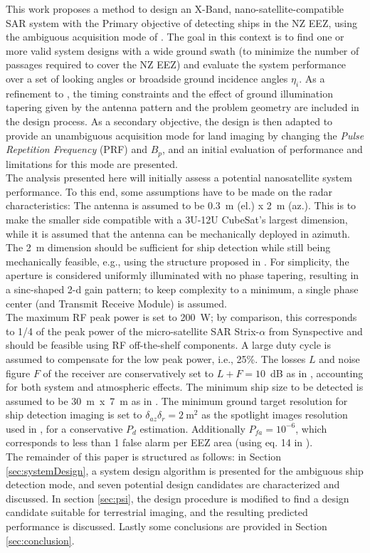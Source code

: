 \documentclass[conference,a4paper]{IEEEtran}
\begin{document}
    This work proposes a method to design an X-Band, nano-satellite-compatible SAR system with the Primary objective of detecting ships in the NZ EEZ, using the ambiguous acquisition mode of \cite{DLRjournal}.
    The goal in this context is to find one or more valid system designs with a wide ground swath (to minimize the number of passages required to cover the NZ EEZ) and evaluate the system performance over a set of looking angles or broadside ground incidence angles $\eta_i$.
    As a refinement to \cite{DLRjournal}, the timing constraints and the effect of ground illumination tapering given by the antenna pattern and the problem geometry are included in the design process.
    As a secondary objective, the design is then adapted to provide an unambiguous acquisition mode for land imaging by changing the \emph{Pulse Repetition Frequency} (PRF) and $B_p$, and an initial evaluation of performance and limitations for this mode are presented.\\
    The analysis presented here will initially assess a potential nanosatellite system performance.
    To this end, some assumptions have to be made on the radar characteristics: The antenna is assumed to be 0.3~m (el.) x 2~m (az.).
    This is to make the smaller side compatible with a 3U-12U CubeSat's largest dimension, while it is assumed that the antenna can be mechanically deployed in azimuth.
    The 2~m dimension should be sufficient for ship detection \cite{DLRjournal} while still being mechanically feasible, e.g., using the structure proposed in \cite{Annalisa}.
    For simplicity, the aperture is considered uniformly illuminated with no phase tapering, resulting in a sinc-shaped 2-d gain pattern;
    to keep complexity to a minimum, a single phase center (and Transmit Receive Module) is assumed.\\
    The maximum RF peak power is set to 200~W; by comparison, this corresponds to 1/4 of the peak power of the micro-satellite SAR Strix-$\alpha$ from Synspective \cite{StriX-a} and should be feasible using RF off-the-shelf components.
    A large duty cycle is assumed to compensate for the low peak power, i.e., 25\%.
    The losses $L$ and noise figure $F$ of the receiver are conservatively set to $L+F = 10$~dB as in \cite{JAN},
    accounting for both system and atmospheric effects.
    The minimum ship size to be detected is assumed to be 30~m~x~7~m as in \cite{JAN}.
    The minimum ground target resolution for ship detection imaging is set to $\delta_{az}\delta_{r}=2~$m$^2$ as the spotlight images resolution used in \cite{DLRjournal}, for a conservative $P_d$ estimation.
    Additionally $P_{fa} = 10^{-6}$, which corresponds to less than 1 false alarm per EEZ area (using eq. 14 in \cite{DLRjournal}).\\
    The remainder of this paper is structured as follows: in Section \ref{sec:systemDesign}, a system design algorithm is presented for the ambiguous ship detection mode, and seven potential design candidates are characterized and discussed.
    In section \ref{sec:psi}, the design procedure is modified to find a design candidate suitable for terrestrial imaging, and the resulting predicted performance is discussed.
    Lastly some conclusions are provided in Section \ref{sec:conclusion}.
\end{document}
